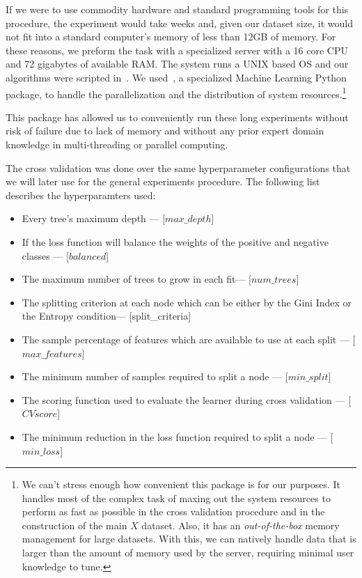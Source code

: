 If we were to use commodity hardware and standard programming tools for this procedure, the experiment would take weeks and, given our dataset size, it would not fit into a standard computer's memory of less than 12GB of memory.
For these reasons, we preform the task with a specialized server with a 16 core CPU and 72 gigabytes of available RAM.\@
The system runs a UNIX based OS and our algorithms were scripted in~\citep{python3.5}.
We used~\citep{graphlab}, a specialized Machine Learning Python package, to handle the parallelization and the distribution of system resources.\footnote{We can't stress enough how convenient this package is for our purposes.
It handles most of the complex task of maxing out the system resources to perform as fast as possible in the cross validation procedure and in the construction of the main $X$ dataset.
Also, it has an \textit{out-of-the-box} memory management for large datasets.
With this, we can natively handle data that is larger than the amount of memory used by the server, requiring minimal user knowledge to tune.}

This package has allowed us to conveniently run these long experiments without risk of failure due to lack of memory and without any prior expert domain knowledge in multi-threading or parallel computing.


The cross validation was done over the same hyperparameter configurations that we will later use for the general experiments procedure.
The following list describes the hyperparamters used:

\begin{itemize}\label{list:random_forest_grid_search_params}

  \item Every tree's maximum depth --- [$max\_depth$]
  \item If the loss function will balance the weights of the positive and negative classes --- [$balanced$]
  \item The maximum number of trees to grow in each fit--- [$num\_trees$]
  \item The splitting criterion at each node which can be either by the Gini Index or the Entropy condition--- [split\_criteria]
  \item The sample percentage of features which are available to use at each split --- [$max\_features$]
  \item The minimum number of samples required to split a node --- [$min\_split$]
  \item The scoring function used to evaluate the learner during cross validation --- [$CV score$]
  \item The minimum reduction in the loss function required to split a node  --- [$min\_loss$]
\end{itemize}

